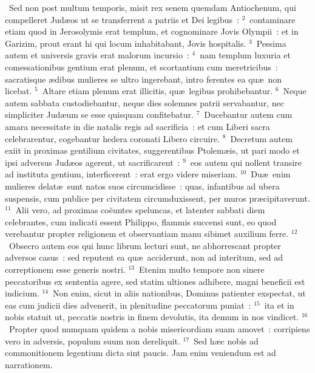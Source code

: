 ~\lettrine[lines=10,image=true,loversize=0.05,lraise=-0.03]{S}{}ed non post multum temporis, misit rex senem quemdam Antiochenum, qui compelleret Jud\ae os ut se transferrent a patriis et Dei legibus~:
${}^{2}$~contaminare etiam quod in Jerosolymis erat templum, et cognominare Jovis Olympii~: et in Garizim, prout erant hi qui locum inhabitabant, Jovis hospitalis.
${}^{3}$~Pessima autem et universis gravis erat malorum incursio~:
${}^{4}$~nam templum luxuria et comessationibus gentium erat plenum, et scortantium cum meretricibus~: sacratisque \ae dibus mulieres se ultro ingerebant, intro ferentes ea qu\ae\ non licebat.
${}^{5}$~Altare etiam plenum erat illicitis, qu\ae\ legibus prohibebantur.
${}^{6}$~Neque autem sabbata custodiebantur, neque dies solemnes patrii servabantur, nec simpliciter Jud\ae um se esse quisquam confitebatur.
${}^{7}$~Ducebantur autem cum amara necessitate in die natalis regis ad sacrificia~: et cum Liberi sacra celebrarentur, cogebantur hedera coronati Libero circuire.
${}^{8}$~Decretum autem exiit in proximas gentilium civitates, suggerentibus Ptolem\ae is, ut pari modo et ipsi adversus Jud\ae os agerent, ut sacrificarent~:
${}^{9}$~eos autem qui nollent transire ad instituta gentium, interficerent~: erat ergo videre miseriam.
${}^{10}$~Du\ae\ enim mulieres delat\ae\ sunt natos suos circumcidisse~: quas, infantibus ad ubera suspensis, cum publice per civitatem circumduxissent, per muros pr\ae cipitaverunt.
${}^{11}$~Alii vero, ad proximas co\"euntes speluncas, et latenter sabbati diem celebrantes, cum indicati essent Philippo, flammis succensi sunt, eo quod verebantur propter religionem et observantiam manu sibimet auxilium ferre.
${}^{12}$~Obsecro autem eos qui hunc librum lecturi sunt, ne abhorrescant propter adversos casus~: sed reputent ea qu\ae\ acciderunt, non ad interitum, sed ad correptionem esse generis nostri.
${}^{13}$~Etenim multo tempore non sinere peccatoribus ex sententia agere, sed statim ultiones adhibere, magni beneficii est indicium.
${}^{14}$~Non enim, sicut in aliis nationibus, Dominus patienter exspectat, ut eas cum judicii dies advenerit, in plenitudine peccatorum puniat~:
${}^{15}$~ita et in nobis statuit ut, peccatis nostris in finem devolutis, ita demum in nos vindicet.
${}^{16}$~Propter quod numquam quidem a nobis misericordiam suam amovet~: corripiens vero in adversis, populum suum non dereliquit.
${}^{17}$~Sed h\ae c nobis ad commonitionem legentium dicta sint paucis. Jam enim veniendum est ad narrationem.


